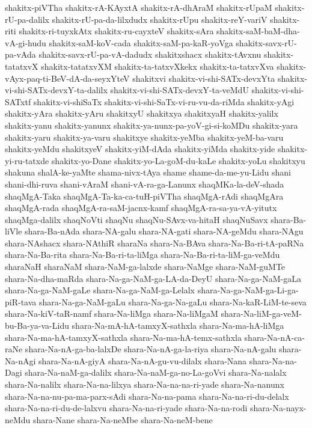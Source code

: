 {shakitx-piVTha
shakitx-rA-KAyxtA
shakitx-rA-dhAraM
shakitx-rUpaM
shakitx-rU-pa-dalilx
shakitx-rU-pa-da-lilxdudx
shakitx-rUpu
shakitx-reY-variV
shakitx-riti
shakitx-ri-tuyxkAtx
shakitx-ru-cayxteV
shakitx-sAra
shakitx-saM-baM-dha-vA-gi-hudu
shakitx-saM-koV-cada
shakitx-saM-pa-kaR-yoVga
shakitx-savx-rU-pa-vAda
shakitx-savx-rU-pa-vA-dadudx
shakitxshacx
shakitx-tAvxnu
shakitx-tatatxvX
shakitx-tatatxvXM
shakitx-ta-tatxvXkekx
shakitx-ta-tatxvXva
shakitx-vAyx-paq-ti-BeV-dA-da-seyxYteV
shakitxvi
shakitx-vi-shi-SATx-devxYta
shakitx-vi-shi-SATx-devxY-ta-dalilx
shakitx-vi-shi-SATx-devxY-ta-veMdU
shakitx-vi-shi-SATxtf
shakitx-vi-shiSaTx
shakitx-vi-shi-SaTx-vi-ru-vu-da-riMda
shakitx-yAgi
shakitx-yAra
shakitx-yAru
shakitxyU
shakitxya
shakitxyaH
shakitx-yalilx
shakitx-yanu
shakitx-yanunx
shakitx-ya-nunx-pa-yoV-gi-si-koMDu
shakitx-yara
shakitx-yaru
shakitx-ya-varu
shakitxye
shakitx-yeMba
shakitx-yeM-ba-varu
shakitx-yeMdu
shakitxyeV
shakitx-yiM-dAda
shakitx-yiMda
shakitx-yide
shakitx-yi-ru-tatxde
shakitx-yo-Dane
shakitx-yo-La-goM-du-kaLe
shakitx-yoLu
shakitxyu
shakuna
shalA-ke-yaMte
shama-nivx-tAya
shame
shame-da-me-yu-Lidu
shani
shani-dhi-ruva
shani-vAraM
shani-vA-ra-ga-Lanunx
shaqMKa-la-deV-shada
shaqMgA-Taka
shaqMgA-Ta-ka-ca-tuH-piVTha
shaqMgA-rAdi
shaqMgAra
shaqMgA-rada
shaqMgA-ra-saM-jacnx-kamf
shaqMgA-ra-sa-ya-vA-yitutx
shaqMga-dalilx
shaqNoVti
shaqNu
shaqNu-SAvx-va-hitaH
shaqNuSavx
shara-Ba-liVle
shara-Ba-nAda
shara-NA-galu
shara-NA-gati
shara-NA-geMdu
shara-NAgu
shara-NAshacx
shara-NAthiR
sharaNa
shara-Na-BAva
shara-Na-Ba-ri-tA-paRNa
shara-Na-Ba-rita
shara-Na-Ba-ri-ta-liMga
shara-Na-Ba-ri-ta-liM-ga-veMdu
sharaNaH
sharaNaM
shara-NaM-ga-lalxde
shara-NaMge
shara-NaM-guMTe
shara-Na-dha-maRda
shara-Na-ga-NaM-ga-LA-da-DeyU
shara-Na-ga-NaM-gaLa
shara-Na-ga-NaM-gaLe
shara-Na-ga-NaM-ga-Lelalx
shara-Na-ga-NaM-ga-Li-ga-piR-tava
shara-Na-ga-NaM-gaLu
shara-Na-ga-Na-gaLu
shara-Na-kaR-LiM-te-seva
shara-Na-kiV-taR-namf
shara-Na-liMga
shara-Na-liMgaM
shara-Na-liM-ga-veM-bu-Ba-ya-va-Lidu
shara-Na-mA-hA-tamxyX-sathxla
shara-Na-ma-hA-liMga
shara-Na-ma-hA-tamxyX-sathxla
shara-Na-ma-hA-temx-sathxla
shara-Na-nA-ca-raNe
shara-Na-nA-ga-ba-lalxDe
shara-Na-nA-ga-la-riya
shara-Na-nA-galu
shara-Na-nAgi
shara-Na-nA-giyA
shara-Na-nA-gu-vu-dilalx
shara-Nana
shara-Na-na-Dagi
shara-Na-naM-ga-dalilx
shara-Na-naM-ga-no-La-goVvi
shara-Na-nalalx
shara-Na-nalilx
shara-Na-na-lilxya
shara-Na-na-na-ri-yade
shara-Na-nanunx
shara-Na-na-nu-pa-ma-parx-sAdi
shara-Na-na-pama
shara-Na-na-ri-du-delalx
shara-Na-na-ri-du-de-lalxvu
shara-Na-na-ri-yade
shara-Na-na-rodi
shara-Na-nayx-neMdu
shara-Nane
shara-Na-neMbe
shara-Na-neM-bene
}
